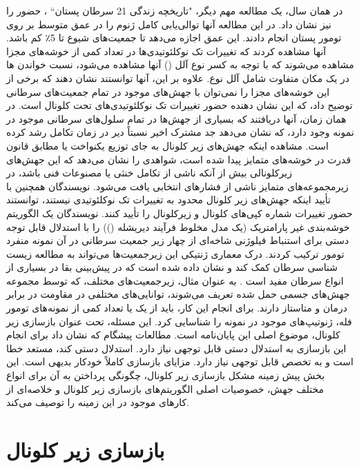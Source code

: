 در همان سال، یک مطالعه مهم دیگر، "تاریخچه زندگی 21 سرطان پستان`` \cite{nik2012life}، حضور  را نیز نشان داد. در این مطالعه آنها توالی‌یابی کامل ژنوم را در عمق متوسط  بر روی تومور پستان  انجام دادند. این عمق اجازه می‌دهد تا جمعیت‌های شیوع تا 5٪ کم باشد. آنها مشاهده کردند که تغییرات تک نوکلئوتیدی‌ها در تعداد کمی از خوشه‌های مجزا مشاهده می‌شوند که با توجه به کسر نوع آلل () آنها مشاهده می‌شود، نسبت خواندن ها در یک مکان متفاوت شامل آلل نوع. علاوه بر این، آنها توانستند نشان دهند که برخی از این خوشه‌های مجزا را نمی‌توان با جهش‌های موجود در تمام جمعیت‌های سرطانی توضیح داد، که این نشان دهنده حضور تغییرات تک نوکلئوتیدی‌های تحت کلونال است. در همان زمان، آنها دریافتند که بسیاری از جهش‌ها در تمام سلول‌های سرطانی موجود در نمونه وجود دارد، که نشان می‌دهد جد مشترک اخیر نسبتاً دیر در زمان تکامل رشد کرده است. مشاهده اینکه جهش‌های زیر کلونال به جای توزیع یکنواخت یا مطابق قانون قدرت در خوشه‌های متمایز پیدا شده است، شواهدی را نشان می‌دهد که این جهش‌های زیرکلونالی بیش از آنکه ناشی از تکامل خنثی یا مصنوعات فنی باشد، در زیرمجموعه‌های متمایز ناشی از فشارهای انتخابی یافت می‌شود. نویسندگان همچنین با تأیید اینکه جهش‌های زیر کلونال محدود به تغییرات تک نوکلئوتیدی  نیستند، توانستند حضور تغییرات شماره کپی‌های کلونال و زیرکلونال را تأیید کنند. نویسندگان یک الگوریتم خوشه‌بندی غیر پارامتریک (یک مدل مخلوط فرآیند دیریشله ()) را با استدلال قابل توجه دستی برای استنباط فیلوژنی شاخه‌ای از چهار زیر جمعیت سرطانی در آن نمونه منفرد تومور ترکیب کردند. درک معماری ژنتیکی این زیرجمعیت‌ها می‌تواند به مطالعه زیست شناسی سرطان کمک کند و نشان داده شده است که در پیش‌بینی بقا در بسیاری از انواع سرطان مفید است \cite{andor2016pan}. به عنوان مثال، زیرجمعیت‌های مختلف، که توسط مجموعه جهش‌های جسمی حمل شده تعریف می‌شوند، توانایی‌های مختلفی در مقاومت در برابر درمان و متاستاز دارند. برای انجام این کار، باید از یک یا تعداد کمی از نمونه‌های تومور فله، ژنوتیپ‌های موجود در نمونه را شناسایی کرد. این مسئله، تحت عنوان بازسازی زیر کلونال، موضوع اصلی این پایان‌نامه است. مطالعات پیشگام که نشان داد  برای انجام این بازسازی به استدلال دستی قابل توجهی نیاز دارد. استدلال دستی کند، مستعد خطا است و به تخصص قابل توجهی نیاز دارد. مزایای بازسازی کاملاً خودکار بدیهی است. این بخش پیش زمینه مشکل بازسازی زیر کلونال، چگونگی پرداختن به آن برای انواع مختلف جهش، خصوصیات اصلی الگوریتم‌های بازسازی زیر کلونال و خلاصه‌ای از کارهای موجود در این زمینه را توصیف می‌کند.

\section{بازسازی زیر کلونال}

